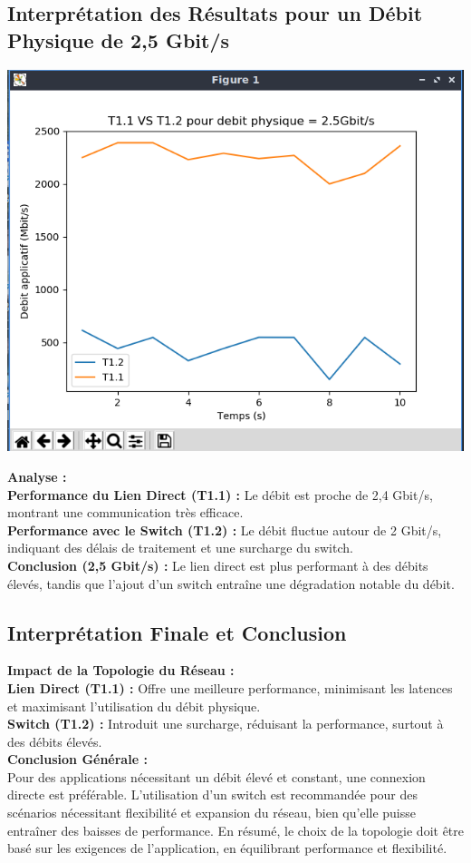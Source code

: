 \subsection{Interprétation des Résultats pour un Débit Physique de 2,5 Gbit/s}
\begin{center}
    \includegraphics[width=1\textwidth]{./images/T1vsT2pour2500.png}
\end{center}
\textbf{Analyse :}\\
\textbf{Performance du Lien Direct (T1.1) :} Le débit est proche de 2,4 Gbit/s, montrant une communication très efficace.\\
\textbf{Performance avec le Switch (T1.2) :} Le débit fluctue autour de 2 Gbit/s, indiquant des délais de traitement et une surcharge du switch.\\
\textbf{Conclusion (2,5 Gbit/s) :} Le lien direct est plus performant à des débits élevés, tandis que l'ajout d'un switch entraîne une dégradation notable du débit.

\subsection{Interprétation Finale et Conclusion}
\textbf{Impact de la Topologie du Réseau :}\\
\textbf{Lien Direct (T1.1) :} Offre une meilleure performance, minimisant les latences et maximisant l'utilisation du débit physique.\\
\textbf{Switch (T1.2) :} Introduit une surcharge, réduisant la performance, surtout à des débits élevés.\\
\textbf{Conclusion Générale :}\\
Pour des applications nécessitant un débit élevé et constant, une connexion directe est préférable. L'utilisation d'un switch est recommandée pour des scénarios nécessitant flexibilité et expansion du réseau, bien qu'elle puisse entraîner des baisses de performance. En résumé, le choix de la topologie doit être basé sur les exigences de l'application, en équilibrant performance et flexibilité.

